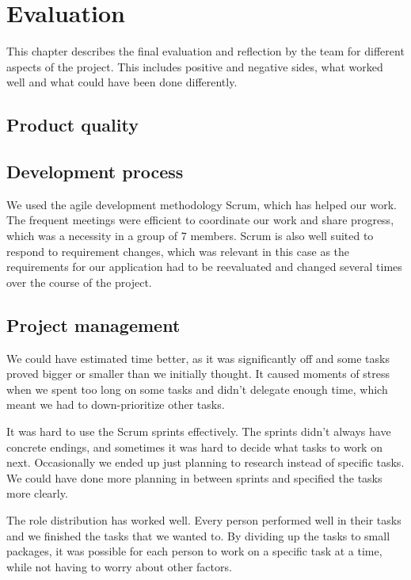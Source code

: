 
\chapter{Evaluation}

This  chapter describes the final evaluation and reflection by the team for different aspects of the project. This includes positive and negative sides, what worked well and what could have been done differently.

\section{Product quality}

\section{Development process}

We used the agile development methodology Scrum, which has helped our work. The frequent meetings were efficient to coordinate our work and share progress, which was a necessity in a group of 7 members. Scrum is also well suited to respond to requirement changes, which was relevant in this case as the requirements for our application had to be reevaluated and changed several times over the course of the project.

\section{Project management}

We could have estimated time better, as it was significantly off and some tasks proved bigger or smaller than we initially thought. It caused moments of stress when we spent too long on some tasks and didn't delegate enough time, which meant we had to down-prioritize other tasks.\newline

It was hard to use the Scrum sprints effectively. The sprints didn't always have concrete endings, and sometimes it was hard to decide what tasks to work on next. Occasionally we ended up just planning to research instead of specific tasks. We could have done more planning in between sprints and specified the tasks more clearly.\newline

The role distribution has worked well. Every person performed well in their tasks and we finished the tasks that we wanted to. By dividing up the tasks to small packages, it was possible for each person to work on a specific task at a time, while not having to worry about other factors.\newline

